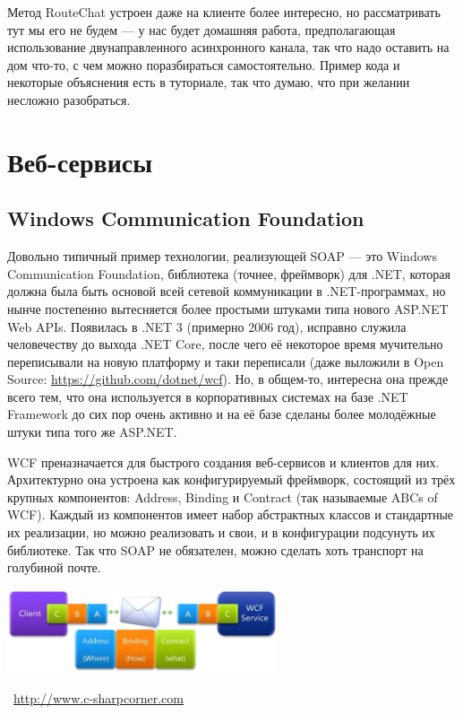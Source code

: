 \documentclass[a5paper]{article}
\newcommand{\attribution}[1] {
    \vspace{-5mm}\begin{flushright}\begin{scriptsize}\textcolor{gray}{\textcopyright\, #1}\end{scriptsize}\end{flushright}
}
\begin{document}
Метод RouteChat устроен даже на клиенте более интересно, но рассматривать тут мы его не будем --- у нас будет домашняя работа, предполагающая использование двунаправленного асинхронного канала, так что надо оставить на дом что-то, с чем можно поразбираться самостоятельно. Пример кода и некоторые объяснения есть в туториале, так что думаю, что при желании несложно разобраться.

\section{Веб-сервисы}

\subsection{Windows Communication Foundation}

Довольно типичный пример технологии, реализующей SOAP --- это Windows Communication Foundation, библиотека (точнее, фреймворк) для .NET, которая должна была быть основой всей сетевой коммуникации в .NET-программах, но нынче постепенно вытесняется более простыми штуками типа нового ASP.NET Web APIs. Появилась в .NET 3 (примерно 2006 год), исправно служила человечеству до выхода .NET Core, после чего её некоторое время мучительно переписывали на новую платформу и таки переписали (даже выложили в Open Source: \url{https://github.com/dotnet/wcf}). Но, в общем-то, интересна она прежде всего тем, что она используется в корпоративных системах на базе .NET Framework до сих пор очень активно и на её базе сделаны более молодёжные штуки типа того же ASP.NET.

WCF преназначается для быстрого создания веб-сервисов и клиентов для них. Архитектурно она устроена как конфигурируемый фреймворк, состоящий из трёх крупных компонентов: Address, Binding и Contract (так называемые ABCs of WCF). Каждый из компонентов имеет набор абстрактных классов и стандартные их реализации, но можно реализовать и свои, и в конфигурации подсунуть их библиотеке. Так что SOAP не обязателен, можно сделать хоть транспорт на голубиной почте.

\begin{center}
    \includegraphics[width=0.6\textwidth]{wcf.png}
    \attribution{\url{http://www.c-sharpcorner.com}}
\end{center}
\end{document}
